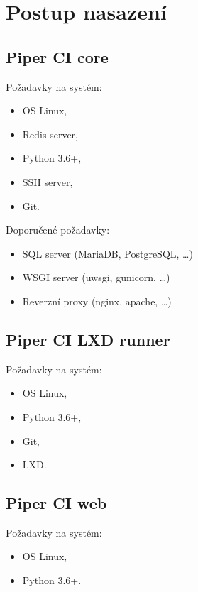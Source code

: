 \clearpage\section{Postup nasazení}

\subsection{Piper CI core}

Požadavky na systém:

\begin{itemize}
	\item OS Linux,
	\item Redis server,
	\item Python 3.6+,
	\item SSH server,
	\item Git.
\end{itemize}

Doporučené požadavky:

\begin{itemize}
	\item SQL server (MariaDB, PostgreSQL, \ldots)
	\item WSGI server (uwsgi, gunicorn, \ldots)
	\item Reverzní proxy (nginx, apache, \ldots)
\end{itemize}

\subsection{Piper CI LXD runner}

Požadavky na systém:

\begin{itemize}
	\item OS Linux,
	\item Python 3.6+,
	\item Git,
	\item LXD.
\end{itemize}

\subsection{Piper CI web}

Požadavky na systém:

\begin{itemize}
	\item OS Linux,
	\item Python 3.6+.
\end{itemize}

